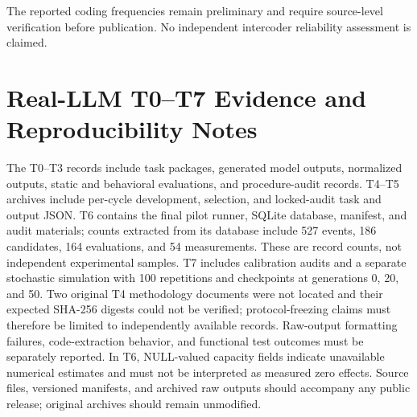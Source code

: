 \documentclass[11pt,a4paper]{article}
\begin{document}
The reported coding frequencies remain preliminary and require source-level verification before publication. No independent intercoder reliability assessment is claimed.


\section{Real-LLM T0--T7 Evidence and Reproducibility Notes}\label{app:real-llm-evidence}
The T0--T3 records include task packages, generated model outputs, normalized outputs, static and behavioral evaluations, and procedure-audit records. T4--T5 archives include per-cycle development, selection, and locked-audit task and output JSON. T6 contains the final pilot runner, SQLite database, manifest, and audit materials; counts extracted from its database include 527 events, 186 candidates, 164 evaluations, and 54 measurements. These are record counts, not independent experimental samples. T7 includes calibration audits and a separate stochastic simulation with 100 repetitions and checkpoints at generations 0, 20, and 50. Two original T4 methodology documents were not located and their expected SHA-256 digests could not be verified; protocol-freezing claims must therefore be limited to independently available records. Raw-output formatting failures, code-extraction behavior, and functional test outcomes must be separately reported. In T6, NULL-valued capacity fields indicate unavailable numerical estimates and must not be interpreted as measured zero effects. Source files, versioned manifests, and archived raw outputs should accompany any public release; original archives should remain unmodified.
\end{document}
